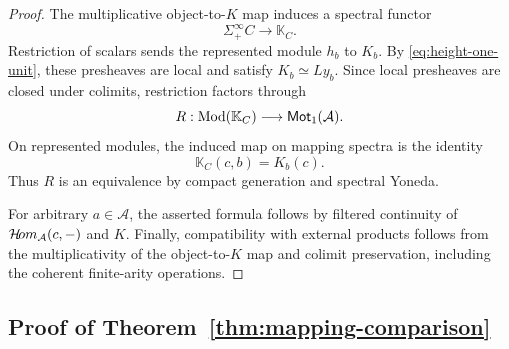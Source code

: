 \begin{proof}
The multiplicative object-to-$K$ map
\citep{BGTMult} induces a spectral functor
\[
 \Sigma^\infty_+C\longrightarrow\mathbb K_C.
\]
Restriction of scalars sends the represented
module $h_b$ to $K_b$. 
By \eqref{eq:height-one-unit}, these
presheaves are local and satisfy
$K_b\simeq Ly_b$.
Since local presheaves
are closed under colimits, restriction
factors through
\[
 R:\operatorname{Mod}(\mathbb K_C)\longrightarrow\mathsf{Mot}_1(\mathcal A).
\]
On represented modules, the induced map
on mapping spectra is the identity
\[
 \mathbb K_C(c,b)=K_b(c).
\]
Thus $R$ is an equivalence by compact
generation and spectral Yoneda.

For arbitrary $a\in\mathcal A$, the asserted
formula follows by filtered continuity of
$\mathcal{H}\!om_{\mathcal A}(c,-)$ and $K$.
Finally, compatibility with external products
follows from the multiplicativity of the
object-to-$K$ map and colimit preservation,
including the coherent finite-arity operations.
\end{proof}

















































\subsection{Proof of Theorem~\ref{thm:mapping-comparison}}


